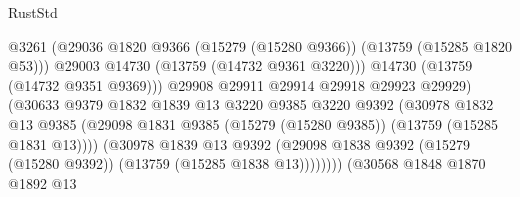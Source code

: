 \begin{lexlean}{RustStd}
\begin{coremodule}
                                              @3261
                                              (@29036
                                                @1820
                                                @9366
                                                (@15279 (@15280 @9366))
                                                (@13759 (@15285 @1820 @53)))
                                              @29003
                                              @14730
                                              (@13759 (@14732 @9361 @3220)))
                                            @14730
                                            (@13759 (@14732 @9351 @9369)))
                                          @29908
                                          @29911
                                          @29914
                                          @29918
                                          @29923
                                          @29929)
                                        (@30633
                                          @9379
                                          @1832
                                          @1839
                                          @13
                                          @3220
                                          @9385
                                          @3220
                                          @9392
                                          (@30978
                                            @1832
                                            @13
                                            @9385
                                            (@29098
                                              @1831
                                              @9385
                                              (@15279 (@15280 @9385))
                                              (@13759 (@15285 @1831 @13))))
                                          (@30978
                                            @1839
                                            @13
                                            @9392
                                            (@29098
                                              @1838
                                              @9392
                                              (@15279 (@15280 @9392))
                                              (@13759 (@15285 @1838 @13))))))))
                                  (@30568
                                    @1848
                                    @1870
                                    @1892
                                    @13

\end{coremodule}
\end{lexlean}
